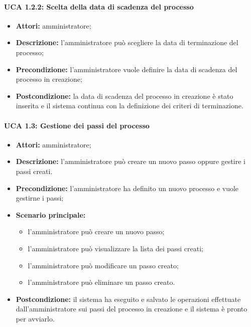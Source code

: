 \paragraph{UCA 1.2.2: Scelta della data di scadenza del processo}
\begin{itemize}
\item \textbf{Attori:}
amministratore;
\item \textbf{Descrizione:}
l'amministratore può scegliere la data di terminazione del processo;
\item \textbf{Precondizione:}
l'amministratore vuole definire la data di scadenza del processo in creazione;
\item \textbf{Postcondizione:}
la data di scadenza del processo in creazione è stato inserita e il sistema continua con la definizione dei criteri di terminazione.
\end{itemize}

\paragraph{UCA 1.3: Gestione dei passi del processo}
\begin{itemize}
\item \textbf{Attori:} 
amministratore;
\item \textbf{Descrizione:} 
l'amministratore può creare un nuovo passo oppure gestire i passi creati.
\item \textbf{Precondizione:} 
l'amministratore ha definito un nuovo processo e vuole gestirne i passi;
\item \textbf{Scenario principale:} 
\begin{itemize}
\item l'amministratore può creare un nuovo passo;
\item l'amministratore può visualizzare la lista dei passi creati;
\item l'amministratore può modificare un passo creato;
\item l'amministratore può eliminare un passo creato.
\end{itemize}
\item \textbf{Postcondizione:}
il sistema ha eseguito e salvato le operazioni effettuate dall'amministratore sui passi del processo in creazione e il sistema è pronto per avviarlo.
\end{itemize}

